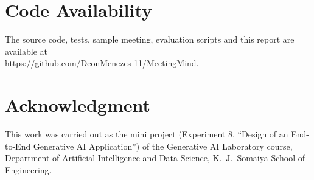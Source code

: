 \documentclass[conference]{IEEEtran}
\begin{document}
\section*{Code Availability}
The source code, tests, sample meeting, evaluation scripts and this report are available at\\
\href{https://github.com/DeonMenezes-11/MeetingMind}{\url{https://github.com/DeonMenezes-11/MeetingMind}}.

\section*{Acknowledgment}
This work was carried out as the mini project (Experiment 8, ``Design of an End-to-End Generative AI Application'') of the
Generative AI Laboratory course, Department of Artificial Intelligence and Data Science, K.~J.~Somaiya School of Engineering.
\end{document}

